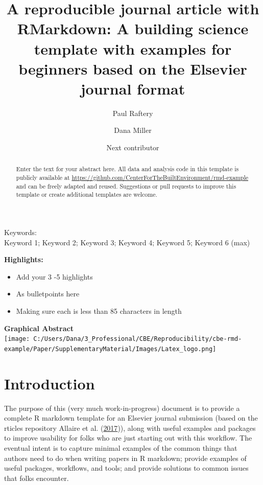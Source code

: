 \documentclass[]{elsarticle} %
\providecommand{\tightlist}{%
  \setlength{\itemsep}{0pt}\setlength{\parskip}{0pt}}
\begin{document}
\begin{frontmatter}

  \title{A reproducible journal article with RMarkdown: A building science
template with examples for beginners based on the Elsevier journal
format}
    \author[CBE]{Paul Raftery}
    \author[CBE]{Dana Miller}
  
  
    \author[Organization2]{Next contributor}
  
  
      \address[CBE]{Center for the Built Environment, UC Berkeley, 390 Wurster Hall,
Berkeley, CA, 94720, USA}
    \address[Organisation2]{Another organization, and their address}
  
  \begin{abstract}
  Enter the text for your abstract here. All data and analysis code in
  this template is publicly available at
  \url{https://github.com/CenterForTheBuiltEnvironment/rmd-example} and
  can be freely adapted and reused. Suggestions or pull requests to
  improve this template or create additional templates are welcome.
  \end{abstract}
  
 \end{frontmatter}

Keywords:\\
Keyword 1; Keyword 2; Keyword 3; Keyword 4; Keyword 5; Keyword 6 (max)

\pagebreak

\textbf{Highlights:}

\begin{itemize}
\tightlist
\item
  Add your 3 -5 highlights
\item
  As bulletpoints here
\item
  Making sure each is less than 85 characters in length
\end{itemize}

\textbf{Graphical Abstract}\\
\texttt{[image: C:/Users/Dana/3\_Professional/CBE/Reproducibility/cbe-rmd-example/Paper/SupplementaryMaterial/Images/Latex\_logo.png]}

\pagebreak

\section{Introduction}\label{introduction}

The purpose of this (very much work-in-progress) document is to provide
a complete R markdown template for an Elsevier journal submission (based
on the rticles repository Allaire et al.
(\protect\hyperlink{ref-rticles}{2017})), along with useful examples and
packages to improve usability for folks who are just starting out with
this workflow. The eventual intent is to capture minimal examples of the
common things that authors need to do when writing papers in R markdown;
provide examples of useful packages, workflows, and tools; and provide
solutions to common issues that folks encounter.
\end{document}
